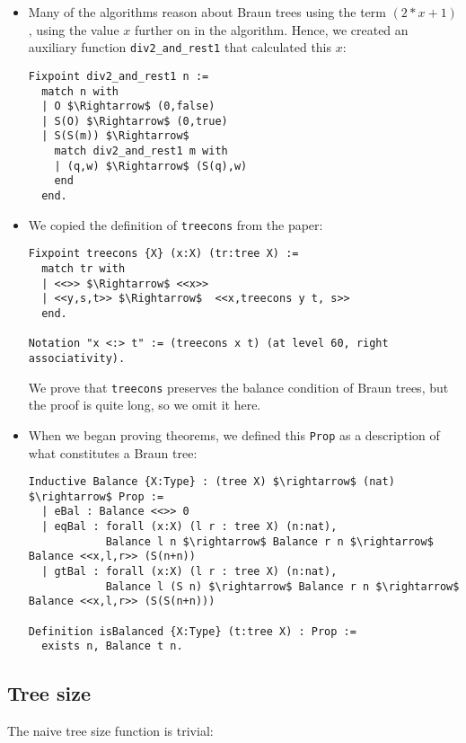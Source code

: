 \documentclass[a4paper,10pt]{article}
\begin{document}
\begin{itemize}

\item Many of the algorithms reason about Braun trees using the term $(2*x+1)$, using the value $x$ further on in the algorithm.
Hence, we created an auxiliary function \texttt{div2\_and\_rest1} that calculated this $x$:

\begin{lstlisting}[mathescape=true]
Fixpoint div2_and_rest1 n := 
  match n with
  | O $\Rightarrow$ (0,false)
  | S(O) $\Rightarrow$ (0,true)
  | S(S(m)) $\Rightarrow$ 
    match div2_and_rest1 m with
    | (q,w) $\Rightarrow$ (S(q),w)
    end
  end.
\end{lstlisting}

\item We copied the definition of \texttt{treecons} from the paper:

\begin{lstlisting}[mathescape=true]
Fixpoint treecons {X} (x:X) (tr:tree X) :=
  match tr with
  | <<>> $\Rightarrow$ <<x>>
  | <<y,s,t>> $\Rightarrow$  <<x,treecons y t, s>>
  end.

Notation "x <:> t" := (treecons x t) (at level 60, right associativity).
\end{lstlisting}

We prove that \texttt{treecons} preserves the balance condition of Braun trees, but the proof is quite long, so we omit it here.

\item When we began proving theorems, we defined this \texttt{Prop} as a description of what constitutes a Braun tree:

\begin{lstlisting}[mathescape=true]
Inductive Balance {X:Type} : (tree X) $\rightarrow$ (nat) $\rightarrow$ Prop :=
  | eBal : Balance <<>> 0
  | eqBal : forall (x:X) (l r : tree X) (n:nat),
            Balance l n $\rightarrow$ Balance r n $\rightarrow$ Balance <<x,l,r>> (S(n+n))
  | gtBal : forall (x:X) (l r : tree X) (n:nat),
            Balance l (S n) $\rightarrow$ Balance r n $\rightarrow$ Balance <<x,l,r>> (S(S(n+n)))

Definition isBalanced {X:Type} (t:tree X) : Prop :=
  exists n, Balance t n.
\end{lstlisting}

\end{itemize}

\subsection{Tree size}
The naive tree size function is trivial:
\end{document}
